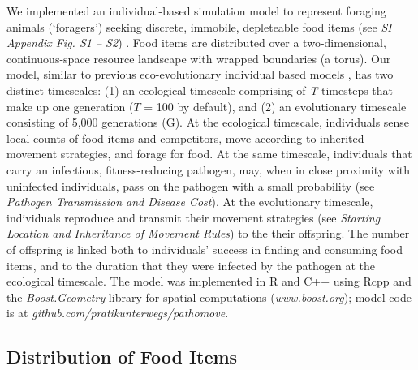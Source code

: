 We implemented an individual-based simulation model to represent foraging animals (`foragers') seeking discrete, immobile, depleteable food items (see \textit{SI Appendix Fig. S1 -- S2}) \autocite{spiegel2017,gupte2021a}.
Food items are distributed over a two-dimensional, continuous-space resource landscape with wrapped boundaries (a torus).
Our model, similar to previous eco-evolutionary individual based models \autocite{getz2015, netz2021, gupte2021a}, has two distinct timescales: (1) an ecological timescale comprising of \textit{T} timesteps that make up one generation ($T$ = 100 by default), and (2) an evolutionary timescale consisting of 5,000 generations (G).
At the ecological timescale, individuals sense local counts of food items and competitors, move according to inherited movement strategies, and forage for food.
At the same timescale, individuals that carry an infectious, fitness-reducing pathogen, may, when in close proximity with uninfected individuals, pass on the pathogen with a small probability (see \textit{Pathogen Transmission and Disease Cost}).
At the evolutionary timescale, individuals reproduce and transmit their movement strategies (see \textit{Starting Location and Inheritance of Movement Rules}) to the their offspring. The number of offspring is linked both to individuals' success in finding and consuming food items, and to the duration that they were infected by the pathogen at the ecological timescale.
The model was implemented in R and C++ using Rcpp \autocite{rcoreteam2020,eddelbuettel2013} and the \textit{Boost.Geometry} library for spatial computations (\textit{www.boost.org}); model code is at \textit{github.com/pratikunterwegs/pathomove}.

\subsection*{Distribution of Food Items}

